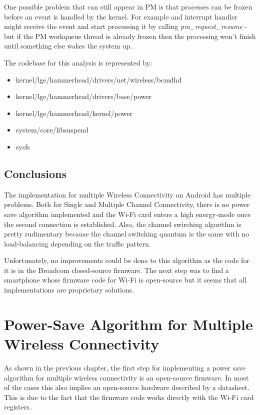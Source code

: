 One possible problem that can still appear in PM is that processes can be frozen before an event is handled by the kernel. For example and interrupt handler might receive the event and start processing it by calling \textit {pm_request_resume} - but if the PM workqueue thread is already frozen then the processing won't finish until something else wakes the system up.

The codebase for this analysis is represented by:
\begin{itemize}
  \item kernel/lge/hammerhead/drivers/net/wireless/bcmdhd
  \item kernel/lge/hammerhead/drivers/base/power
  \item kernel/lge/hammerhead/kernel/power
  \item system/core/libsuspend
  \item sysfs
\end{itemize}

\section{Conclusions}
\label{sec:conclusions}

The implementation for multiple Wireless Connectivity on Android has multiple problems. Both for Single and Multiple Channel Connectivity, there is no power save algorithm implemented and the Wi-Fi card enters a high energy-mode once the second connection is established. Also, the channel swirching algorithm is pretty rudimentary because the channel switching quantum is the same with no load-balancing depending on the traffic pattern. 

Unfortunately, no improvements could be done to this algorithm as the code for it is in the Broadcom closed-source firmware. The next step was to find a smartphone whose firmware code for Wi-Fi is open-source but it seems that all implementations are proprietary solutions.

\chapter{Power-Save Algorithm for Multiple Wireless Connectivity}

As shown in the previous chapter, the first step for implementing a power save algorithm for multiple wireless connectivity is an open-source firmware. In most of the cases this also implies an open-source hardware described by a datasheet. This is due to the fact that the firmware code works directly with the Wi-Fi card registers.

